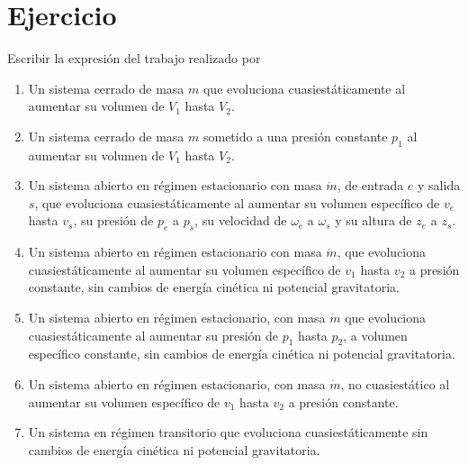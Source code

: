 \section{Ejercicio}\label{ej:Chap04Ejercicio02}
Escribir la expresión del trabajo realizado por
\begin{enumerate}
    \item Un sistema cerrado de masa $m$ que evoluciona cuasiestáticamente al aumentar su volumen de $V_1$ hasta $V_2$.
    \item Un sistema cerrado de masa $m$ sometido a una presión constante $p_1$ al aumentar su volumen de $V_1$ hasta $V_2$.
    \item Un sistema abierto en régimen estacionario con masa $\dot{m}$, de entrada $e$ y salida $s$, que evoluciona cuasiestáticamente al aumentar su volumen específico de $v_e$ hasta $v_s$, su presión de $p_e$ a $p_s$, su velocidad de $\omega_e$ a $\omega_s$ y su altura de $z_e$ a $z_s$.
    \item Un sistema abierto en régimen estacionario con masa $\dot{m}$, que evoluciona cuasiestáticamente al aumentar su volumen específico de $v_1$ hasta $v_2$ a presión constante, sin cambios de energía cinética ni potencial gravitatoria.
    \item Un sistema abierto en régimen estacionario, con masa $\dot{m}$ que evoluciona cuasiestáticamente al aumentar su presión de $p_1$ hasta $p_2$, a volumen específico constante, sin cambios de energía cinética ni potencial gravitatoria.
    \item Un sistema abierto en régimen estacionario, con masa $\dot{m}$, no cuasiestático al aumentar su volumen específico de $v_1$ hasta $v_2$ a presión constante.
    \item Un sistema en régimen transitorio que evoluciona cuasiestáticamente sin cambios de energía cinética ni potencial gravitatoria.
\end{enumerate}